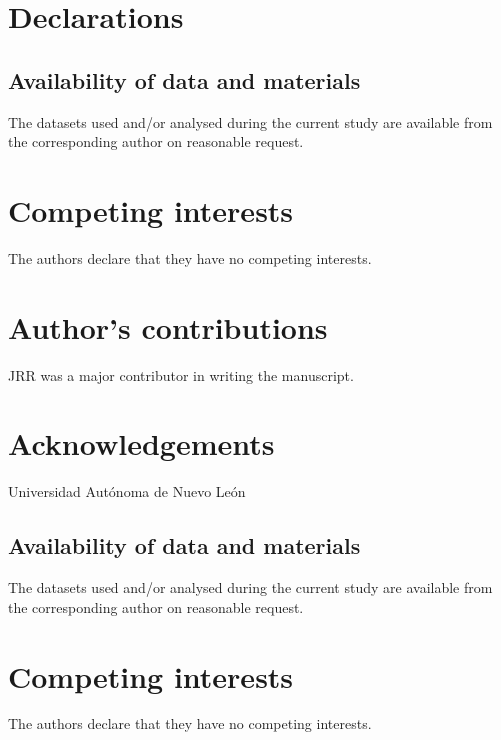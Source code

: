 \documentclass[twocolumn]{bmcart}%
\begin{document}
\begin{backmatter}

\section*{Declarations}

\subsection*{Availability of data and materials}
The datasets used and/or analysed during the current study are available from the corresponding author on reasonable request.

\section*{Competing interests}
  The authors declare that they have no competing interests.

\section*{Author's contributions}
JRR was a major contributor in writing the manuscript.

\section*{Acknowledgements}
Universidad Autónoma de Nuevo León

\subsection*{Availability of data and materials}
The datasets used and/or analysed during the current study are available from the corresponding author on reasonable request.

\section*{Competing interests}
  The authors declare that they have no competing interests.



\end{backmatter}
\end{document}
